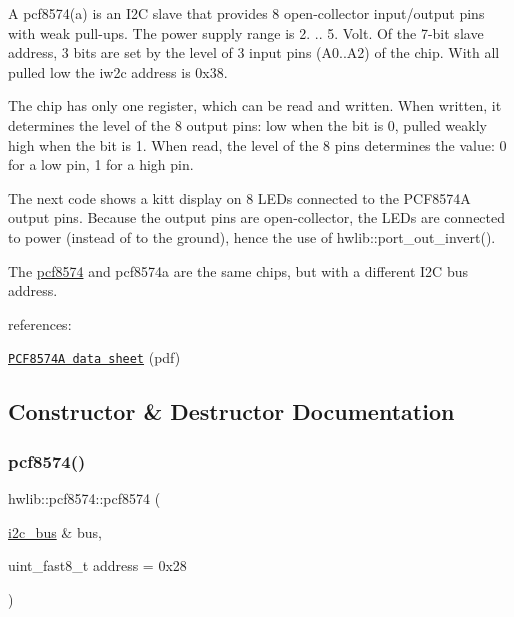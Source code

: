 A pcf8574(a) is an I2C slave that provides 8 open-\/collector input/output pins with weak pull-\/ups. The power supply range is 2. .. 5. Volt. Of the 7-\/bit slave address, 3 bits are set by the level of 3 input pins (A0..A2) of the chip. With all pulled low the iw2c address is 0x38.



The chip has only one register, which can be read and written. When written, it determines the level of the 8 output pins\+: low when the bit is 0, pulled weakly high when the bit is 1. When read, the level of the 8 pins determines the value\+: 0 for a low pin, 1 for a high pin.



The next code shows a kitt display on 8 L\+E\+Ds connected to the P\+C\+F8574A output pins. Because the output pins are open-\/collector, the L\+E\+Ds are connected to power (instead of to the ground), hence the use of hwlib\+::port\+\_\+out\+\_\+invert(). 
\begin{DoxyCodeInclude}
\end{DoxyCodeInclude}
 The \hyperlink{classhwlib_1_1pcf8574}{pcf8574} and pcf8574a are the same chips, but with a different I2C bus address.



references\+:
\begin{DoxyItemize}
\item \href{http://www.nxp.com/documents/data_sheet/PCF8574_PCF8574A.pdf}{\tt P\+C\+F8574A data sheet} (pdf) 
\end{DoxyItemize}

\subsection{Constructor \& Destructor Documentation}
\mbox{\label{classhwlib_1_1pcf8574_a128f60cf8695a3528ca8fbcbb427ec88}} 
\subsubsection{\texorpdfstring{pcf8574()}{pcf8574()}}
{\footnotesize\ttfamily hwlib\+::pcf8574\+::pcf8574 (\begin{DoxyParamCaption}\item[{\hyperlink{classhwlib_1_1i2c__bus}{i2c\+\_\+bus} \&}]{bus,  }\item[{uint\+\_\+fast8\+\_\+t}]{address = {\ttfamily 0x28} }\end{DoxyParamCaption})\hspace{0.3cm}{\ttfamily [inline]}}

